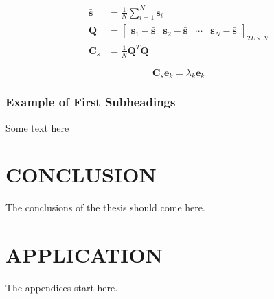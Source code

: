 \documentclass[a4paper,onesided,12pt]{report}
\begin{document}
\begin{align} 
\mathbf{\bar{s}} & =\frac{1}{N} \sum_{i=1}^N \mathbf{s}_i
\label{eq:mean}   
\\
\mathbf{Q} & =\left[ 
\begin{array}{cccc} 
 \mathbf{s}_1  - \mathbf{\bar{s}} & \mathbf{s}_2 - \mathbf{\bar{s}} &
\cdots & \mathbf{s}_N  - \mathbf{\bar{s}}
\end{array}
\right]_{2L\times N }
\label{eq:q}
\\ 
\mathbf{C}_s & =\frac{1}{N} \mathbf{Q}^T \mathbf{Q}
\label{eq:cov_matrix}
\end{align}

\begin{equation}
    \mathbf{C}_s \mathbf{e}_k = \lambda_k \mathbf{e}_k
    \label{eq:pca}
\end{equation}

\subsection{Example of First Subheadings}
Some text here
\chapter{CONCLUSION}
\label{chapter:conclusion}

The conclusions of the thesis should come
here.




\appendix
\chapter{APPLICATION}
The appendices start here.
\end{document}
